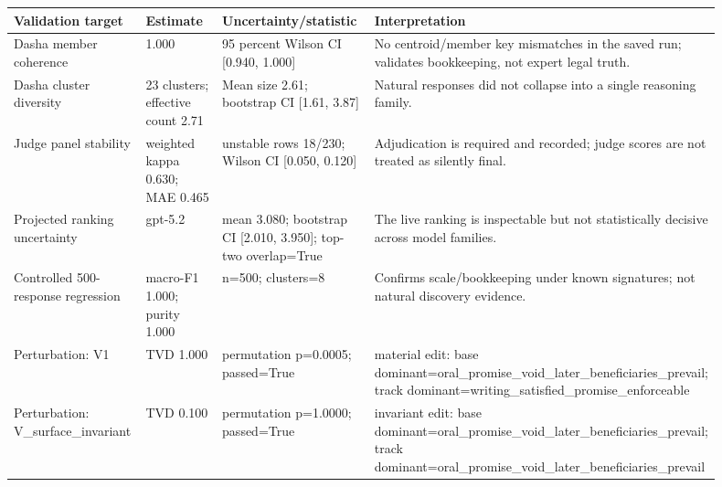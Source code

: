 \begin{tabular}{p{0.21\linewidth}p{0.18\linewidth}p{0.27\linewidth}p{0.24\linewidth}}
\toprule
Validation target & Estimate & Uncertainty/statistic & Interpretation \\
\midrule
Dasha member coherence & 1.000 & 95 percent Wilson CI [0.940, 1.000] & No centroid/member key mismatches in the saved run; validates bookkeeping, not expert legal truth. \\
Dasha cluster diversity & 23 clusters; effective count 2.71 & Mean size 2.61; bootstrap CI [1.61, 3.87] & Natural responses did not collapse into a single reasoning family. \\
Judge panel stability & weighted kappa 0.630; MAE 0.465 & unstable rows 18/230; Wilson CI [0.050, 0.120] & Adjudication is required and recorded; judge scores are not treated as silently final. \\
Projected ranking uncertainty & gpt-5.2 & mean 3.080; bootstrap CI [2.010, 3.950]; top-two overlap=True & The live ranking is inspectable but not statistically decisive across model families. \\
Controlled 500-response regression & macro-F1 1.000; purity 1.000 & n=500; clusters=8 & Confirms scale/bookkeeping under known signatures; not natural discovery evidence. \\
Perturbation: V1 & TVD 1.000 & permutation p=0.0005; passed=True & material edit: base dominant=oral\_promise\_void\_later\_beneficiaries\_prevail; track dominant=writing\_satisfied\_promise\_enforceable \\
Perturbation: V\_surface\_invariant & TVD 0.100 & permutation p=1.0000; passed=True & invariant edit: base dominant=oral\_promise\_void\_later\_beneficiaries\_prevail; track dominant=oral\_promise\_void\_later\_beneficiaries\_prevail \\
\bottomrule
\end{tabular}
